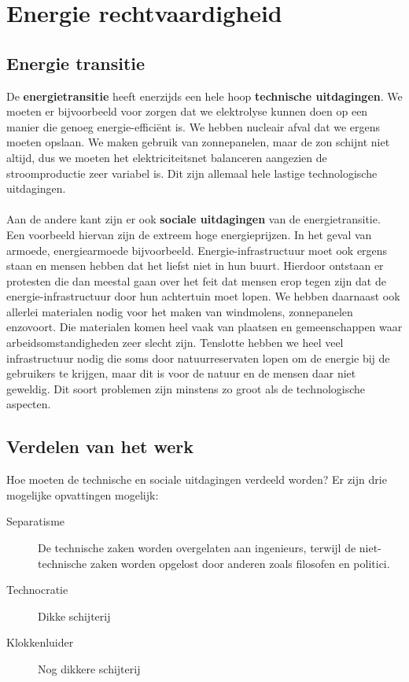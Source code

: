 \documentclass[../summary.tex]{subfiles}
\begin{document}
	
	\section{Energie rechtvaardigheid}
	\subsection{Energie transitie}
	
	De \textbf{energietransitie} heeft enerzijds een hele hoop \textbf{technische uitdagingen}. We moeten er bijvoorbeeld voor zorgen dat we elektrolyse kunnen doen op een manier die genoeg energie-efficiënt is. We hebben nucleair afval dat we ergens moeten opslaan. We maken gebruik van zonnepanelen, maar de zon schijnt niet altijd, dus we moeten het elektriciteitsnet balanceren aangezien de stroomproductie zeer variabel is. Dit zijn allemaal hele lastige technologische uitdagingen. \\
	\\
	Aan de andere kant zijn er ook \textbf{sociale uitdagingen} van de energietransitie. Een voorbeeld hiervan zijn de extreem hoge energieprijzen. In het geval van armoede, energiearmoede bijvoorbeeld. Energie-infrastructuur moet ook ergens staan en mensen hebben dat het liefst niet in hun buurt. Hierdoor ontstaan er protesten die dan meestal gaan over het feit dat mensen erop tegen zijn dat de energie-infrastructuur door hun achtertuin moet lopen. We hebben daarnaast ook allerlei materialen nodig voor het maken van windmolens, zonnepanelen enzovoort. Die materialen komen heel vaak van plaatsen en gemeenschappen waar arbeidsomstandigheden zeer slecht zijn. Tenslotte hebben we heel veel infrastructuur nodig die soms door natuurreservaten lopen om de energie bij de gebruikers te krijgen, maar dit is voor de natuur en de mensen daar niet geweldig. Dit soort problemen zijn minstens zo groot als de technologische aspecten. 
	
	\subsection{Verdelen van het werk}
	
	Hoe moeten de technische en sociale uitdagingen verdeeld worden?  Er zijn drie mogelijke opvattingen mogelijk:

	\begin{description}
		\item[Separatisme] De technische zaken worden overgelaten aan ingenieurs, terwijl de niet-technische zaken worden opgelost door anderen zoals filosofen en politici.
		\item [Technocratie] Dikke schijterij
		\item [Klokkenluider] Nog dikkere schijterij 
	\end{description}
	
\end{document}
